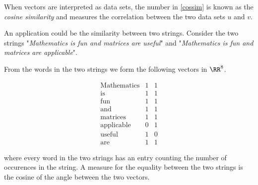 \documentclass{article}
\begin{document}
\begin{example}

  When vectors are interpreted as data sets,
  the number in \eqref{cossim} is known as the \emph{cosine similarity}
and measures the correlation between the two data sets
$u$ and $v$.

An application could be the similarity between two strings.
Consider the two strings 
"\emph{Mathematics is fun and matrices are useful}"
and
"\emph{Mathematics is fun and matrices are applicable}".

%
From the words in the two strings we form the following vectors in $\RR^8$.

$$
\begin{array}{lll}
  \text{Mathematics} & 1 & 1\\[0.5em]
  \text{is} & 1& 1\\[0.5em]
  \text{fun} & 1 & 1\\[0.5em]
  \text{and} & 1 & 1\\[0.5em]
  \text{matrices} & 1 & 1\\[0.5em]
  \text{applicable} & 0 & 1\\[0.5em]
  \text{useful} & 1 & 0\\[0.5em]
  \text{are} & 1 & 1
\end{array}
$$

%
where every word in the two strings has an entry counting the number of
occurences in the string. A measure for the equality between
the two strings is the cosine of the angle between the two vectors.


\end{example}
\end{document}
